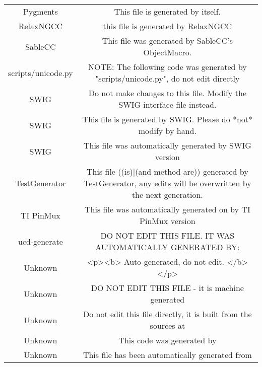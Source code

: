 \begin{table}
\begin{tabularx}{\textwidth}{c|C}
		Pygments & This file is generated by itself. \\
		RelaxNGCC & this file is generated by RelaxNGCC \\
		SableCC & This file was generated by SableCC's ObjectMacro. \\
		scripts/unicode.py & NOTE: The following code was generated by "scripts/unicode.py", do not edit directly \\
		SWIG & Do not make changes to this file. Modify the SWIG interface file instead. \\
		SWIG & This file is generated by SWIG. Please do *not* modify by hand. \\
		SWIG & This file was automatically generated by SWIG version \version \\
		TestGenerator & This file ((is)|(and method are)) generated by TestGenerator, any edits will be overwritten by the next generation. \\
		TI PinMux & This file was automatically generated on \timestamp by TI PinMux version \version \\
		ucd-generate & DO NOT EDIT THIS FILE. IT WAS AUTOMATICALLY GENERATED BY: \\
		Unknown & <p><b> Auto-generated, do not edit. </b></p> \\
		Unknown & DO NOT EDIT THIS FILE - it is machine generated \\
		Unknown & Do not edit this file directly, it is built from the sources at \link \\
		Unknown & This code was generated by \\
		Unknown & This file has been automatically generated from \class \\	
	\end{tabularx}
\end{table}
\setlength{\extrarowheight}{0em}